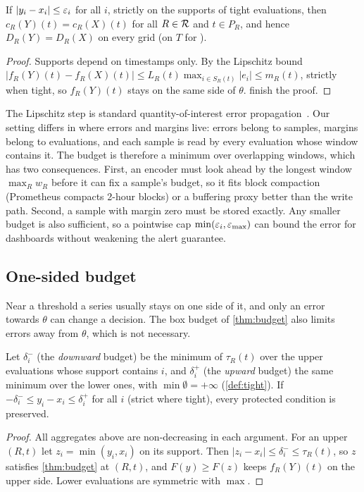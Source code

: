 \begin{theorem}
\label{thm:budget}
If $|y_i - x_i| \le \varepsilon_i$ for all $i$, strictly on the supports of tight
evaluations, then $c_R(Y)(t) = c_R(X)(t)$ for all
$R \in \mathcal{R}$ and $t \in P_R$, and hence $D_R(Y) = D_R(X)$ on every grid (on $T$
for ).
\end{theorem}
\begin{proof}
Supports depend on timestamps only. By the Lipschitz bound
$|f_R(Y)(t) - f_R(X)(t)| \le L_R(t)\max_{i\in S_R(t)}|e_i| \le m_R(t)$,
strictly when tight, so $f_R(Y)(t)$ stays on the same side of $\theta$.
 finish the proof.
\end{proof}

The Lipschitz step is standard quantity-of-interest error
propagation~\cite{jiao2022qoi}. Our setting differs in where errors and
margins live: errors belong to samples, margins belong to evaluations, and
each sample is read by every evaluation whose window contains it. The
budget is therefore a minimum over overlapping windows, which has two
consequences. First, an encoder must look ahead by the longest window
$\max_R w_R$ before it can fix a sample's budget, so it fits block
compaction (Prometheus compacts 2-hour blocks) or a buffering proxy better
than the write path. Second, a sample with margin zero must be stored
exactly. Any smaller budget is also sufficient, so a pointwise cap
$\min(\varepsilon_i, \varepsilon_{\max})$ can bound the error for dashboards without
weakening the alert guarantee.

\subsection{One-sided budget}

Near a threshold a series usually stays on one side of it, and only an
error towards $\theta$ can change a decision. The box budget of
\cref{thm:budget} also limits errors away from $\theta$, which is not
necessary.

\begin{corollary}
\label{cor:onesided}
Let $\delta^-_i$ (the \emph{downward} budget) be the minimum of
$\tau_R(t)$ over the upper evaluations whose support contains $i$, and
$\delta^+_i$ (the \emph{upward} budget) the same minimum over the lower
ones, with $\min\emptyset = +\infty$ (\cref{def:tight}). If
$-\delta^-_i \le y_i - x_i \le \delta^+_i$ for all $i$ (strict where
tight), every protected condition is preserved.
\end{corollary}
\begin{proof}
All aggregates above are non-decreasing in each argument. For an upper
$(R,t)$ let $z_i = \min(y_i, x_i)$ on its support. Then
$|z_i - x_i| \le \delta^-_i \le \tau_R(t)$, so $z$ satisfies
\cref{thm:budget} at $(R,t)$, and $F(y) \ge F(z)$ keeps $f_R(Y)(t)$ on the
upper side. Lower evaluations are symmetric with $\max$.
\end{proof}

